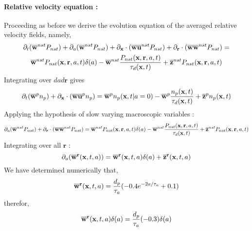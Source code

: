 \paragraph[short]{Relative velocity equation :}
Proceeding as before we derive the evolution equation of the averaged relative velocity fields, 
namely, 
\begin{multline}
    \partial_t (\overline{\textbf{w}}^{nst} P_{nst})
    + \partial_a (\overline{\textbf{w}}^{nst} P_{nst})
    + \partial_{\textbf{x}} \cdot (\overline{\textbf{w}\textbf{u} }^{nst} P_{nst})
    + \partial_{\textbf{r}}  \cdot (\overline{\textbf{w}\textbf{w}}^{nst} P_{nst})
    =  \\
    \overline{\textbf{w}}^{nst} P_{nst}(\textbf{x},\textbf{r},a,t)\delta(a)
    - \overline{\textbf{w}}^{nst}  \frac{P_{nst}(\textbf{x},\textbf{r},a,t)}{\tau_d(\textbf{x},t)}
    + \overline{\textbf{z}}^{nst}P_{nst}(\textbf{x},\textbf{r},a,t)
\end{multline}
Integrating over $dad\textbf{r}$ gives
\begin{equation}
    \partial_t (\overline{\textbf{w}}^{p} n_p)
    + \partial_{\textbf{x}} \cdot (\overline{\textbf{w}\textbf{u} }^{p} n_p)
    =  \\
    \overline{\textbf{w}}^{p} n_p(\textbf{x},t|a=0)
    - \overline{\textbf{w}}^{p}  \frac{n_p(\textbf{x},t)}{\tau_d(\textbf{x},t)}
    + \overline{\textbf{z}}^{p}n_p(\textbf{x},t)
\end{equation}
Applying the hypothesis of slow varying macroscopic variables : 
\begin{equation}
    \partial_a (\overline{\textbf{w}}^{nst} P_{nst})
    +\partial_{\textbf{r}}  \cdot (\overline{\textbf{w}\textbf{w}}^{nst} P_{nst})
    =  
    \overline{\textbf{w}}^{nst} P_{nst}(\textbf{x},\textbf{r},a,t)\delta(a)
    - \overline{\textbf{w}}^{nst}  \frac{P_{nst}(\textbf{x},\textbf{r},a,t)}{\tau_d(\textbf{x},t)}
    + \overline{\textbf{z}}^{nst}P_{nst}(\textbf{x},\textbf{r},a,t)
\end{equation}
Integrating over all $\textbf{r}$ :
\begin{equation}
    \partial_a (\overline{\textbf{w}}^{\textbf{r}}(\textbf{x},t,a))
    =  
    \overline{\textbf{w}}^{\textbf{r}}(\textbf{x},t,a)\delta(a)
    + \overline{\textbf{z}}^{\textbf{r}}(\textbf{x},t,a)
    \label{eq:da_w}
\end{equation}
We have determined numerically that,  
\begin{equation*}
    \overline{\textbf{w}}^{\textbf{r}}(\textbf{x},t,a)
    = \frac{d_p}{\tau_a}(- 0.4 e^{ - 2a/\tau_a}+0.1)
\end{equation*}
therefor, 
\begin{equation*}
    \overline{\textbf{w}}^{\textbf{r}}(\textbf{x},t,a)\delta(a)
    = \frac{d_p}{\tau_a}(-0.3)\delta(a)
\end{equation*}
